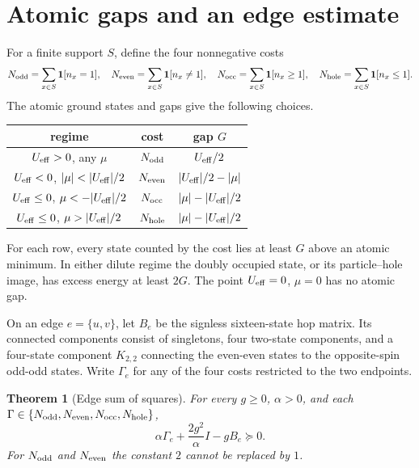 \documentclass[11pt]{article}
\newtheorem{theorem}{Theorem}
\begin{document}
\section{Atomic gaps and an edge estimate}

For a finite support $S$, define the four nonnegative costs
\[
 N_{\rm odd}=\sum_{x\in S}\mathbf 1[n_x=1],\quad
 N_{\rm even}=\sum_{x\in S}\mathbf 1[n_x\ne1],\quad
 N_{\rm occ}=\sum_{x\in S}\mathbf 1[n_x\ge1],\quad
 N_{\rm hole}=\sum_{x\in S}\mathbf 1[n_x\le1].
\]
The atomic ground states and gaps give the following choices.
\begin{center}
\begin{tabular}{c|c|c}
regime & cost & gap $G$ \\
\hline
$U_{\rm eff}>0$, any $\mu$ & $N_{\rm odd}$ & $U_{\rm eff}/2$ \\
$U_{\rm eff}<0$, $|\mu|<|U_{\rm eff}|/2$ & $N_{\rm even}$ & $|U_{\rm eff}|/2-|\mu|$ \\
$U_{\rm eff}\le0$, $\mu<-|U_{\rm eff}|/2$ & $N_{\rm occ}$ & $|\mu|-|U_{\rm eff}|/2$ \\
$U_{\rm eff}\le0$, $\mu>|U_{\rm eff}|/2$ & $N_{\rm hole}$ & $|\mu|-|U_{\rm eff}|/2$
\end{tabular}
\end{center}
For each row, every state counted by the cost lies at least $G$ above an atomic minimum. In either dilute regime the doubly occupied state, or its particle–hole image, has excess energy at least $2G$. The point $U_{\rm eff}=0$, $\mu=0$ has no atomic gap.

On an edge $e=\{u,v\}$, let $B_e$ be the signless sixteen-state hop matrix. Its connected components consist of singletons, four two-state components, and a four-state component $K_{2,2}$ connecting the even-even states to the opposite-spin odd-odd states. Write $\Gamma_e$ for any of the four costs restricted to the two endpoints.

\begin{theorem}[Edge sum of squares]\label{thm:sos}
For every $g\ge0$, $\alpha>0$, and each $\Gamma\in\{N_{\rm odd},N_{\rm even},N_{\rm occ},N_{\rm hole}\}$,
\[
 \alpha\Gamma_e+\frac{2g^2}{\alpha}I-gB_e\succeq0.
\]
For $N_{\rm odd}$ and $N_{\rm even}$ the constant $2$ cannot be replaced by $1$.
\end{theorem}
\end{document}
